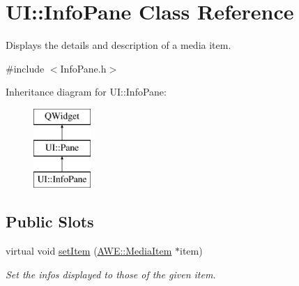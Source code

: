 \hypertarget{class_u_i_1_1_info_pane}{\section{U\-I\-:\-:Info\-Pane Class Reference}
\label{class_u_i_1_1_info_pane}
}


Displays the details and description of a media item.  




{\ttfamily \#include $<$Info\-Pane.\-h$>$}

Inheritance diagram for U\-I\-:\-:Info\-Pane\-:\begin{figure}[H]
\begin{center}
\leavevmode
\includegraphics[height=3.000000cm]{class_u_i_1_1_info_pane}
\end{center}
\end{figure}
\subsection*{Public Slots}
\begin{DoxyCompactItemize}
\item 
virtual void \hyperlink{class_u_i_1_1_info_pane_a4bbb238cf6e15b89f17fe3761ef57e8d}{set\-Item} (\hyperlink{class_a_w_e_1_1_media_item}{A\-W\-E\-::\-Media\-Item} $\ast$item)
\begin{DoxyCompactList}\small\item\em Set the infos displayed to those of the given item. \end{DoxyCompactList}\end{DoxyCompactItemize}
